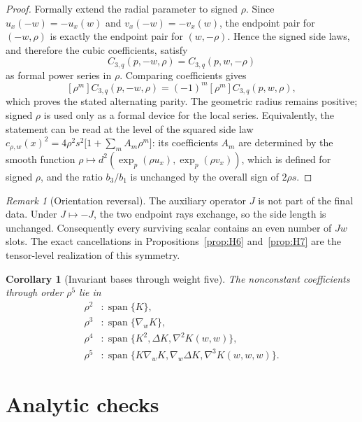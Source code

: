 \documentclass[11pt]{amsart}
\numberwithin{equation}{section}
\newtheorem{corollary}[theorem]{Corollary}
\theoremstyle{remark}
\newtheorem{remark}[theorem]{Remark}
\newcommand{\Hess}{\nabla^2}
\newcommand{\Third}{\nabla^3}
\newcommand{\Span}{\operatorname{span}}
\begin{document}
\begin{proof}
Formally extend the radial parameter to signed $\rho$.  Since $u_x(-w)=-u_x(w)$ and $v_x(-w)=-v_x(w)$, the endpoint pair for $(-w,\rho)$ is exactly the endpoint pair for $(w,-\rho)$.  Hence the signed side laws, and therefore the cubic coefficients, satisfy
\[
C_{3,q}(p,-w,\rho)=C_{3,q}(p,w,-\rho)
\]
as formal power series in $\rho$.  Comparing coefficients gives
\[
[\rho^m]C_{3,q}(p,-w,\rho)=(-1)^m[\rho^m]C_{3,q}(p,w,\rho),
\]
which proves the stated alternating parity.  The geometric radius remains positive; signed $\rho$ is used only as a formal device for the local series.  Equivalently, the statement can be read at the level of the squared side law $c_{\rho,w}(x)^2=4\rho^2s^2\bigl[1+\sum_mA_m\rho^m\bigr]$: its coefficients $A_m$ are determined by the smooth function $\rho\mapsto d^2(\exp_p(\rho u_x),\exp_p(\rho v_x))$, which is defined for signed $\rho$, and the ratio $b_3/b_1$ is unchanged by the overall sign of $2\rho s$.
\end{proof}

\begin{remark}[Orientation reversal]
The auxiliary operator $J$ is not part of the final data.  Under $J\mapsto-J$, the two endpoint rays exchange, so the side length is unchanged.  Consequently every surviving scalar contains an even number of $Jw$ slots.  The exact cancellations in Propositions~\ref{prop:H6} and~\ref{prop:H7} are the tensor-level realization of this symmetry.
\end{remark}

\begin{corollary}[Invariant bases through weight five]
The nonconstant coefficients through order $\rho^5$ lie in
\[
\begin{aligned}
\rho^2 &: \Span\{K\},\\
\rho^3 &: \Span\{\nabla_wK\},\\
\rho^4 &: \Span\{K^2,\Delta K,\Hess K(w,w)\},\\
\rho^5 &: \Span\{K\nabla_wK,\nabla_w\Delta K,\Third K(w,w,w)\}.
\end{aligned}
\]
\end{corollary}

\section{Analytic checks}\label{sec:checks}
\end{document}
